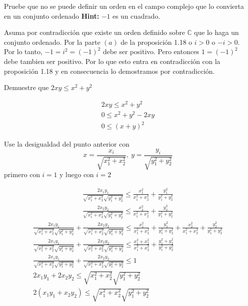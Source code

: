 \documentclass[12pt]{article}
\newenvironment{ex}[2][Ejercicio]{\begin{trivlist}
\item[\hskip \labelsep {\bfseries #1}\hskip \labelsep {\bfseries #2.}]}{\end{trivlist}}
\newenvironment{sol}[1][Solución]{\begin{trivlist}
\item[\hskip \labelsep {\bfseries #1:}]}{\end{trivlist}}
\begin{document}
\begin{ex}{1.8}
	Pruebe que no se puede definir un orden en el campo complejo que lo convierta en un conjunto ordenado \textbf{Hint:} $-1$ es un cuadrado.
\end{ex}

\begin{sol}
	Asuma por contradicción que existe un orden definido sobre $\mathbb{C}$ que lo haga un conjunto ordenado. Por la parte $(a)$ de la proposición 1.18 o $i > 0$  o $-i > 0$. Por lo tanto, $-1 = i^2 = (-1)^2$ debe ser positivo. Pero entonces $1 = (-1)^2$ debe tambien ser positivo. Por lo que esto entra en contradicción con la proposición 1.18 y en consecuencia lo demostramos por contradicción.
\end{sol}

\begin{ex}{2.1}
	Demuestre que $2xy\le x^2 + y^2$
\end{ex}
\begin{sol}
	\begin{align*}
		2xy \le x^2 + y^2\\
		0 \le x^2 + y^2 - 2xy\\
		0 \le (x + y)^2
	\end{align*}
\end{sol}
\begin{ex}{2.2}
	Use la desigualdad del punto anterior con $$x = \frac{x_i}{\sqrt{x_1^2 + x_2^2}},\ y = \frac{y_i}{\sqrt{y_1^2 + y_2^2}}$$ primero con $i=1$ y luego con $i=2$ 
\end{ex}
\begin{sol}
	\begin{align*}
		\frac{2x_1y_1}{\sqrt{x_1^2+x_2^2}\sqrt{y_1^2+y_2^2}} \le \frac{x_1^2}{x_1^2+x_2^2} + \frac{y_1^2}{y_1^2+y_2^2}\\
		\frac{2x_2y_2}{\sqrt{x_1^2+x_2^2}\sqrt{y_1^2+y_2^2}} \le \frac{x_2^2}{x_1^2+x_2^2} + \frac{y_2^2}{y_1^2+y_2^2}
	\end{align*}
	\begin{align*}
		\frac{2x_1y_1}{\sqrt{x_1^2+x_2^2}\sqrt{y_1^2+y_2^2}} + \frac{2x_2y_2}{\sqrt{x_1^2+x_2^2}\sqrt{y_1^2+y_2^2}} \le \frac{x_1^2}{x_1^2+x_2^2} + \frac{y_1^2}{y_1^2+y_2^2} + \frac{x_2^2}{x_1^2+x_2^2} + \frac{y_2^2}{y_1^2+y_2^2}\\
		\frac{2x_1y_1}{\sqrt{x_1^2+x_2^2}\sqrt{y_1^2+y_2^2}} + \frac{2x_2y_2}{\sqrt{x_1^2+x_2^2}\sqrt{y_1^2+y_2^2}} \le \frac{x_1^2 + x_2^2}{x_1^2+x_2^2} + \frac{y_1^2 + y_2^2}{y_1^2+y_2^2}\\
		\frac{2x_1y_1}{\sqrt{x_1^2+x_2^2}\sqrt{y_1^2+y_2^2}} + \frac{2x_2y_2}{\sqrt{x_1^2+x_2^2}\sqrt{y_1^2+y_2^2}} \le 1 \\
		2x_1y_1 + 2x_2y_2 \le \sqrt{x_1^2+x_2^2}\sqrt{y_1^2+y_2^2}\\
		2(x_1y_1 + x_2y_2) \le \sqrt{x_1^2+x_2^2}\sqrt{y_1^2+y_2^2}\\
	\end{align*}
\end{sol}
\end{document}
